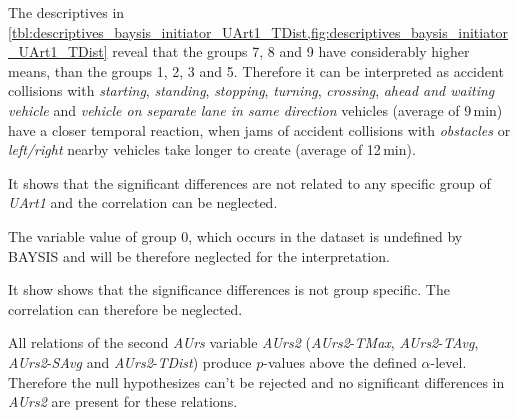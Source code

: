 The descriptives in \cref{tbl:descriptives_baysis_initiator_UArt1_TDist,fig:descriptives_baysis_initiator_UArt1_TDist} reveal that the groups 7, 8 and 9 have considerably higher means, than the groups 1, 2, 3 and 5. Therefore it can be interpreted as accident collisions with \textit{starting}, \textit{standing}, \textit{stopping}, \textit{turning}, \textit{crossing}, \textit{ahead and waiting vehicle} and \textit{vehicle on separate lane in same direction} vehicles (average of 9\,min) have a closer temporal reaction, when jams of accident collisions with \textit{obstacles} or \textit{left/right} nearby vehicles take longer to create (average of 12\,min).

It shows that the significant differences are not related to any specific group of \textit{UArt1} and the correlation can be neglected.

 The variable value of group 0, which occurs in the dataset is undefined by BAYSIS and will be therefore neglected for the interpretation.  

It show shows that the significance differences is not group specific. The correlation can therefore be neglected.

\medskip
All relations of the second \textit{AUrs} variable \textit{AUrs2} (\textit{AUrs2}-\textit{TMax}, \textit{AUrs2}-\textit{TAvg}, \textit{AUrs2}-\textit{SAvg} and \textit{AUrs2}-\textit{TDist}) produce $p$-values above the defined $\alpha$-level. Therefore the null hypothesizes can't be rejected and no significant differences in \textit{AUrs2} are present for these relations.
 

